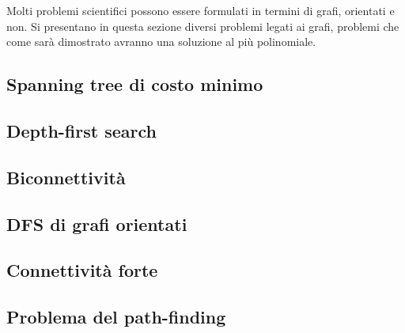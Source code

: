 \documentclass{subfiles}
\begin{document}
Molti problemi scientifici possono essere formulati in termini di grafi, orientati e non.
Si presentano in questa sezione diversi problemi legati ai grafi, problemi che come sarà dimostrato avranno una soluzione al più polinomiale.

\subsection{Spanning tree di costo minimo}

\clearpage

\subsection{Depth-first search}

\clearpage

\subsection{Biconnettività}

\clearpage

\subsection{DFS di grafi orientati}

\clearpage

\subsection{Connettività forte}

\clearpage

\subsection{Problema del path-finding}

\end{document}
